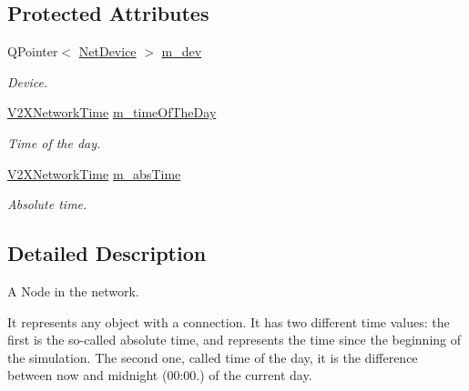 \subsection*{Protected Attributes}
\begin{DoxyCompactItemize}
\item 
Q\+Pointer$<$ \hyperlink{classNetDevice}{Net\+Device} $>$ \hyperlink{classV2XNetworkNode_a040b748993cb648258421981439f7ec3}{m\+\_\+dev}\hypertarget{classV2XNetworkNode_a040b748993cb648258421981439f7ec3}{}\label{classV2XNetworkNode_a040b748993cb648258421981439f7ec3}

\begin{DoxyCompactList}\small\item\em Device. \end{DoxyCompactList}\item 
\hyperlink{classV2XNetworkTime}{V2\+X\+Network\+Time} \hyperlink{classV2XNetworkNode_a445b08f1b991d2860eb204898bedccf5}{m\+\_\+time\+Of\+The\+Day}\hypertarget{classV2XNetworkNode_a445b08f1b991d2860eb204898bedccf5}{}\label{classV2XNetworkNode_a445b08f1b991d2860eb204898bedccf5}

\begin{DoxyCompactList}\small\item\em Time of the day. \end{DoxyCompactList}\item 
\hyperlink{classV2XNetworkTime}{V2\+X\+Network\+Time} \hyperlink{classV2XNetworkNode_ae7f74fac1bf8958cbb6b15c6325ffeb8}{m\+\_\+abs\+Time}\hypertarget{classV2XNetworkNode_ae7f74fac1bf8958cbb6b15c6325ffeb8}{}\label{classV2XNetworkNode_ae7f74fac1bf8958cbb6b15c6325ffeb8}

\begin{DoxyCompactList}\small\item\em Absolute time. \end{DoxyCompactList}\end{DoxyCompactItemize}


\subsection{Detailed Description}
A Node in the network. 

It represents any object with a connection. It has two different time values\+: the first is the so-\/called absolute time, and represents the time since the beginning of the simulation. The second one, called time of the day, it is the difference between now and midnight (00\+:00.) of the current day.

